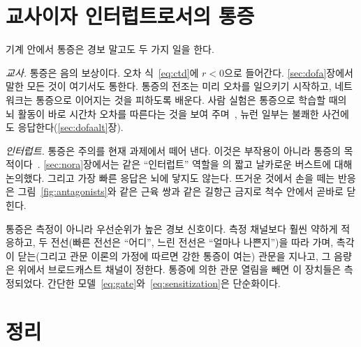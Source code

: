 \section{교사이자 인터럽트로서의 통증}

기계 안에서 통증은 경보 말고도 두 가지 일을 한다.

\emph{교사.} 통증은 음의 보상이다. 오차 식~\eqref{eq:ctd}에 $r<0$으로 들어간다. \ref{sec:dofa}장에서 말한 모든 것이 여기서도 통한다. 통증의 전조는 미리 오차를 일으키기 시작하고, 네트워크는 통증으로 이어지는 것을 피하도록 배운다. 사람 실험은 통증으로 학습할 때의 뇌 활동이 바로 시간차 오차를 따른다는 것을 보여 주며~\cite{Seymour2004},  뉴런 일부는 불쾌한 사건에도 응답한다(\ref{sec:dofaalt}장).

\emph{인터럽트.} 통증은 주의를 현재 과제에서 떼어 낸다. 이것은 부작용이 아니라 통증의 목적이다~\cite{EcclestonCrombez1999}. \ref{sec:nora}장에서는 같은 “인터럽트” 역할을 의 짧고 날카로운 버스트에 대해 논의했다. 그리고 가장 빠른 응답은 뇌에 닿지도 않는다. 뜨거운 것에서 손을 떼는 반응은 그림~\ref{fig:antagonists}와 같은 근육 쌍과 같은 길항근 금지로 척수 안에서 곧바로 닫힌다.

\begin{keyblock}
\begin{proposition}[경보 신호]
\label{prop:pain}
통증은 측정이 아니라 우선순위가 높은 경보 신호이다. 측정 채널보다 훨씬 약하게 적응하고, 두 전선(빠른 전선은 “어디”, 느린 전선은 “얼마나 나쁜지”)을 따라 가며, 촉각이 닫는(그리고 관문 이론의 가정에 따르면 강한 통증이 여는) 관문을 지나고, 그 음량은 위에서 브로드캐스트 채널이 정한다. 통증에 의한 관문 열림을 빼면 이 장치들은 측정되었다. 간단한 모델~\eqref{eq:gate}와~\eqref{eq:sensitization}은 단순화이다.
\end{proposition}
\end{keyblock}

\section{정리}

